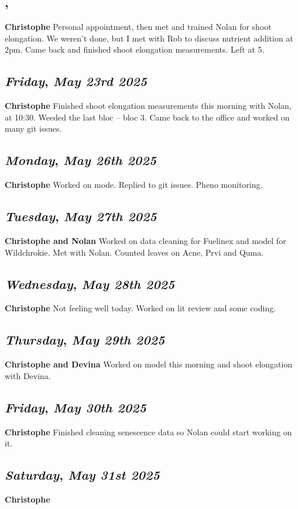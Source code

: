 \subsection*{\weekday, \day}
\textbf {Christophe}
Personal appointment, then met and trained Nolan for shoot elongation. We weren't done, but I met with Rob to discuss nutrient addition at 2pm. Came back and finished shoot elongation measurements. Left at 5.

\def\day{\textit{May 23rd 2025}}
\def\weekday{\textit{Friday}}
\subsection*{\weekday, \day}
\textbf {Christophe}
Finished shoot elongation measurements this morning with Nolan, at 10:30. Weeded the last bloc -- bloc 3. Came back to the office and worked on many git issues. 

\def\day{\textit{May 26th 2025}}
\def\weekday{\textit{Monday}}
\subsection*{\weekday, \day}
\textbf {Christophe}
Worked on mode. Replied to git issues. Pheno monitoring. 

\def\day{\textit{May 27th 2025}}
\def\weekday{\textit{Tuesday}}
\subsection*{\weekday, \day}
\textbf {Christophe and Nolan}
Worked on data cleaning for Fuelinex and model for Wildchrokie. Met with Nolan. Counted leaves on Acne, Prvi and Quma.

\def\day{\textit{May 28th 2025}}
\def\weekday{\textit{Wednesday}}
\subsection*{\weekday, \day}
\textbf {Christophe}
Not feeling well today. Worked on lit review and some coding. 

\def\day{\textit{May 29th 2025}}
\def\weekday{\textit{Thursday}}
\subsection*{\weekday, \day}
\textbf {Christophe and Devina}
Worked on model this morning and shoot elongation with Devina. 

\def\day{\textit{May 30th 2025}}
\def\weekday{\textit{Friday}}
\subsection*{\weekday, \day}
\textbf {Christophe}
Finished cleaning senescence data so Nolan could start working on it. 
\def\day{\textit{May 31st 2025}}
\def\weekday{\textit{Saturday}}
\subsection*{\weekday, \day}
\textbf {Christophe}
